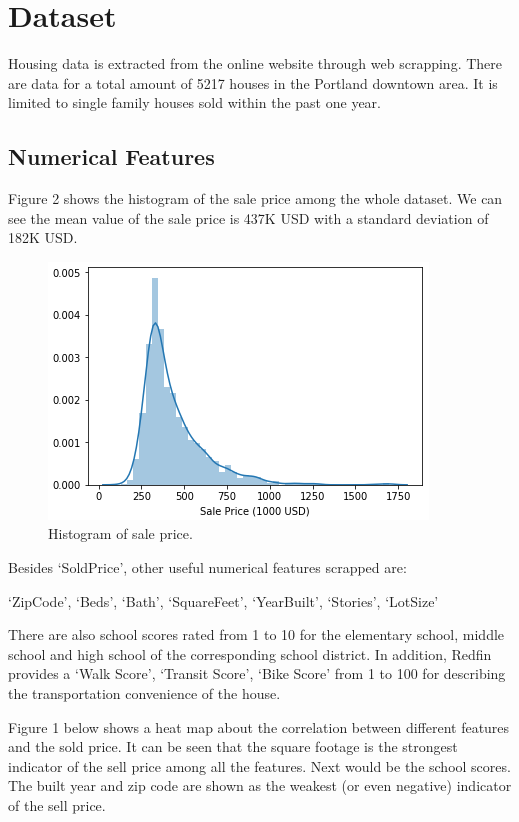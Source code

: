 \documentclass{article} %
\begin{document}
\section{Dataset}

Housing data is extracted from the online website through web scrapping.
There are data for a total amount of 5217 houses in the 
Portland downtown area.
It is limited to single family houses sold within the past one year.


\subsection{Numerical Features}

Figure 2 shows the histogram of the sale price among the whole dataset.
We can see the mean value of the sale price is 437K USD
with a standard deviation of 182K USD.

\begin{figure}[h]
	\begin{center}
		\includegraphics[width=0.5\linewidth]{fig/sale_price.png}
	\end{center}
	\caption{Histogram of sale price.}
	\label{fig:long}
	\label{fig:onecol}
\end{figure}

Besides `SoldPrice', other useful numerical features scrapped are:

`ZipCode', `Beds', `Bath', `SquareFeet', `YearBuilt', `Stories', `LotSize'

There are also school scores rated from 1 to 10 for the elementary school, middle school and high school
of the corresponding school district.
In addition, Redfin provides a `Walk Score', `Transit Score', `Bike Score' from 1 to 100
for describing the transportation convenience of the house.

Figure 1 below shows a heat map about the correlation between different features and the sold price.
It can be seen that the square footage is the strongest indicator of the sell price among all the features.
Next would be the school scores.
The built year and zip code are shown as the weakest (or even negative) indicator of the sell price.
\end{document}
